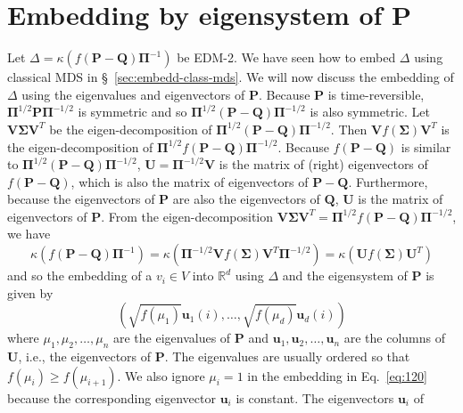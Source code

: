 \section{Embedding by eigensystem of P}
\label{sec:embedd-eigensyst-p}
Let $\Delta = \kappa(f(\mathbf{P} - \mathbf{Q})\bm{\Pi}^{-1})$ be
EDM-2. We have seen how to embed $\Delta$ using classical MDS in
\S~\ref{sec:embedd-class-mds}. We will now discuss the embedding of
$\Delta$ using the eigenvalues and eigenvectors of
$\mathbf{P}$. Because $\mathbf{P}$ is time-reversible, $\bm{\Pi}^{1/2}
\mathbf{P} \bm{\Pi}^{-1/2}$ is symmetric and so
$\bm{\Pi}^{1/2}(\mathbf{P} - \mathbf{Q})\bm{\Pi}^{-1/2}$ is also
symmetric. Let $\mathbf{V} \bm{\Sigma} \mathbf{V}^{T}$ be the
eigen-decomposition of $\bm{\Pi}^{1/2}(\mathbf{P} -
\mathbf{Q})\bm{\Pi}^{-1/2}$. Then $\mathbf{V} f(\bm{\Sigma})
\mathbf{V}^{T}$ is the eigen-decomposition of $\bm{\Pi}^{1/2}
f(\mathbf{P} - \mathbf{Q}) \bm{\Pi}^{-1/2}$. Because $f(\mathbf{P} -
\mathbf{Q})$ is similar to $\bm{\Pi}^{1/2}(\mathbf{P} -
\mathbf{Q})\bm{\Pi}^{-1/2}$, $\mathbf{U} = \bm{\Pi}^{-1/2}\mathbf{V}$ is the matrix
of (right) eigenvectors of $f(\mathbf{P} - \mathbf{Q})$, which is also
the matrix of eigenvectors of $\mathbf{P} - \mathbf{Q}$. Furthermore,
because the eigenvectors of $\mathbf{P}$ are also the eigenvectors of
$\mathbf{Q}$, $\mathbf{U}$ is the matrix of
eigenvectors of $\mathbf{P}$. From the eigen-decomposition
$\mathbf{V}\bm{\Sigma}\mathbf{V}^{T} =
\bm{\Pi}^{1/2}f(\mathbf{P}-\mathbf{Q})\bm{\Pi}^{-1/2}$, we have
\begin{equation*}
    \kappa(f(\mathbf{P} - \mathbf{Q})\bm{\Pi}^{-1})=
    \kappa(\bm{\Pi}^{-1/2}\mathbf{V}f(\bm{\Sigma})\mathbf{V}^{T}\bm{\Pi}^{-1/2}) = \kappa(\mathbf{U} f(\bm{\Sigma})
    \mathbf{U}^{T})
\end{equation*}
and so the embedding of a $v_i \in V$ into $\mathbb{R}^{d}$ using
$\Delta$ and the eigensystem of $\mathbf{P}$ is given by
\begin{equation}
  \label{eq:120}
   (\sqrt{f(\mu_1)} \mathbf{u}_1(i),
    \dots, \sqrt{f(\mu_d)} \mathbf{u}_{d}(i))
\end{equation}
where $\mu_1, \mu_2, \dots, \mu_n$ are the eigenvalues of $\mathbf{P}$
and $\mathbf{u}_1, \mathbf{u}_2, \dots, \mathbf{u}_n$ are the columns
of $\mathbf{U}$, i.e., the eigenvectors of $\mathbf{P}$.  The
eigenvalues are usually ordered so that $f(\mu_i) \geq
f(\mu_{i+1})$. We also ignore $\mu_i = 1$ in the embedding in
Eq.~\eqref{eq:120} because the corresponding eigenvector
$\mathbf{u}_i$ is constant. The eigenvectors $\mathbf{u}_i$ of
